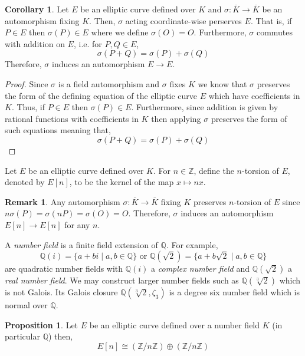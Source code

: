 \documentclass{article}
\newcommand{\Z}{\mathbb{Z}}
\newcommand{\Q}{\mathbb{Q}}
\theoremstyle{definition}
\newtheorem{proposition}[theorem]{Proposition}
\newtheorem{corollary}[theorem]{Corollary}
\newtheorem{remark}{Remark}[section]
\newenvironment{definition}[1][Definition:]{\begin{trivlist}
\item[\hskip \labelsep {\bfseries #1}]}{\end{trivlist}}
\begin{document}
\begin{corollary}
Let $E$ be an elliptic curve defined over $K$ and $\sigma : \overline{K} \to \overline{K}$ be an automorphism fixing $K$. Then, $\sigma$ acting coordinate-wise perserves $E$. That is, if $P \in E$ then $\sigma(P) \in E$ where we define $\sigma(O) = O$. Furthermore, $\sigma$ commutes with addition on $E$, i.e. for $P, Q \in E$,
\[ \sigma(P + Q) = \sigma(P) + \sigma(Q) \]
Therefore, $\sigma$ induces an automorphism $E \to E$.  
\end{corollary}

\begin{proof}
Since $\sigma$ is a field automorphism and $\sigma$ fixes $K$ we know that $\sigma$ preserves the form of the defining equation of the elliptic curve $E$ which have coefficients in $K$. Thus, if $P \in E$ then $\sigma(P) \in E$. Furthermore, since addition is given by rational functions with coefficients in $K$ then applying $\sigma$ preserves the form of such equations meaning that,
\[ \sigma(P + Q) = \sigma(P) + \sigma(Q) \]
\end{proof}

\begin{definition}
Let $E$ be an elliptic curve defined over $K$. For $n \in \Z$, define the $n$-torsion of $E$, denoted by $E[n]$, to be the kernel of the map $x \mapsto n x$. 
\end{definition}

\begin{remark}
Any automorphism $\sigma : \overline{K} \to \overline{K}$ fixing $K$ preserves $n$-torsion of $E$ since $n \sigma(P) = \sigma(nP) = \sigma(O) = O$. Therefore, $\sigma$ induces an automorphism $E[n] \to E[n]$ for any $n$. 
\end{remark}

\begin{definition}
A \textit{number field} is a finite field extension of $\Q$. For example, 
\[ \Q(i) = \{ a + b i \mid a,b \in \Q \} \text{ or } \Q(\sqrt{2}) = \{ a + b \sqrt{2} \mid a,b \in \Q \} \]
are quadratic number fields with $\Q(i)$ a \textit{complex number field} and $\Q(\sqrt{2})$ a \textit{real number field}. We may construct larger number fields such as $\Q(\sqrt[3]{2})$ which is not Galois. Its Galois closure $\Q(\sqrt[3]{2}, \zeta_3)$ is a degree six number field which is normal over $\Q$.  
\end{definition}

\begin{proposition}
Let $E$ be an elliptic curve defined over a number field $K$ (in particular $\Q$) then, \[ E[n] \cong (\Z / n \Z) \oplus (\Z / n \Z) \]
\end{proposition}
\end{document}
